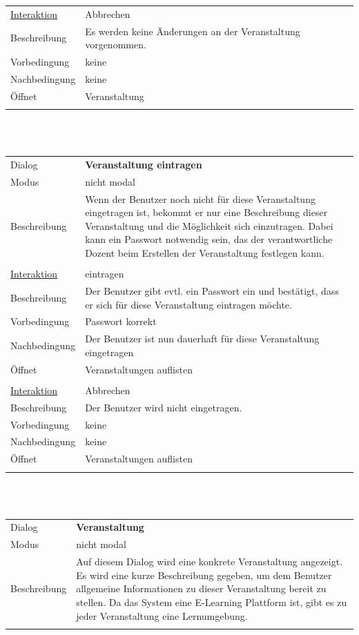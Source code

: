 \documentclass[12pt,a4paper]{article}
\begin{document}
{\begin{tabular}{l p{12cm}}
\underline{Interaktion}  	 & Abbrechen\\ 
Beschreibung   	 & Es werden keine Änderungen an der Veranstaltung vorgenommen.  \\
Vorbedingung	 & keine \\
Nachbedingung	 & keine \\
Öffnet			 & \glqq Veranstaltung\grqq \\\\
\hline
\end{tabular}\\\\

\begin{tabular}{l p{12cm}}
Dialog 	 & \textbf{Veranstaltung eintragen} \\ 
Modus & nicht modal\\ 
Beschreibung   	 & Wenn der Benutzer noch nicht für diese Veranstaltung eingetragen ist, bekommt er nur eine Beschreibung dieser Veranstaltung und die Möglichkeit sich einzutragen. Dabei kann ein Passwort notwendig sein, das der verantwortliche Dozent beim Erstellen der Veranstaltung festlegen kann.\\\\ 

\underline{Interaktion}  	 & eintragen\\ 
Beschreibung   	 & Der Benutzer gibt evtl. ein Passwort ein und bestätigt, dass er sich für diese Veranstaltung eintragen möchte.  \\
Vorbedingung	 & Passwort korrekt \\
Nachbedingung	 & Der Benutzer ist nun dauerhaft für diese Veranstaltung eingetragen \\
Öffnet			 & \glqq Veranstaltungen auflisten\grqq \\\\

\underline{Interaktion}  	 & Abbrechen\\ 
Beschreibung   	 & Der Benutzer wird nicht eingetragen.  \\
Vorbedingung	 & keine \\
Nachbedingung	 & keine \\
Öffnet			 & \glqq Veranstaltungen auflisten\grqq \\\\

\hline
\end{tabular}\\\\

\begin{tabular}{l p{12cm}}
Dialog 	 & \textbf{Veranstaltung} \\ 
Modus & nicht modal\\ 
Beschreibung   	 & Auf diesem Dialog wird eine konkrete Veranstaltung angezeigt. Es wird eine kurze Beschreibung gegeben, um dem Benutzer allgemeine Informationen zu dieser Veranstaltung bereit zu stellen. Da das System eine E-Learning Plattform ist, gibt es zu jeder Veranstaltung eine Lernumgebung.\\\\ 


\end{tabular}}
\end{document}
